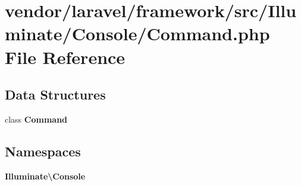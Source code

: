\section{vendor/laravel/framework/src/\+Illuminate/\+Console/\+Command.php File Reference}
\label{vendor_2laravel_2framework_2src_2_illuminate_2_console_2_command_8php}
\subsection*{Data Structures}
\begin{DoxyCompactItemize}
\item 
class {\bf Command}
\end{DoxyCompactItemize}
\subsection*{Namespaces}
\begin{DoxyCompactItemize}
\item 
 {\bf Illuminate\textbackslash{}\+Console}
\end{DoxyCompactItemize}
